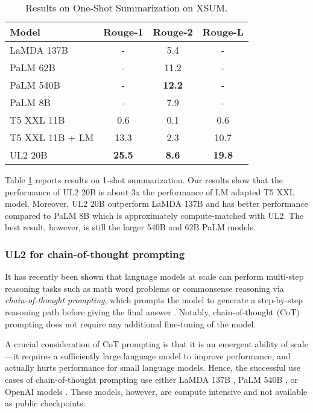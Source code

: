 \documentclass[10pt]{article}
\begin{document}
\begin{table}[H]
    \centering
    \small
      \caption{Results on One-Shot Summarization on XSUM.}
    \label{tab:1shot_xsum}
    \begin{tabular}{lccc}
    \toprule 
    Model     & Rouge-1 & Rouge-2 & Rouge-L  \\
    \midrule
    LaMDA 137B & - & 5.4 & -\\
    PaLM 62B & - & 11.2 & -\\
    PaLM 540B & - & \textbf{12.2} & -\\
    \midrule
    PaLM 8B & - & 7.9 & - \\
        T5 XXL 11B &  0.6 & 0.1 & 0.6 \\
        T5 XXL 11B + LM & 13.3 & 2.3 & 10.7 \\
        UL2 20B & \textbf{25.5} & \textbf{8.6} & \textbf{19.8}\\
        \bottomrule
    \end{tabular}
\end{table}
Table \ref{tab:1shot_xsum} reports results on 1-shot summarization. Our results show that the performance of UL2 20B is about 3x the performance of LM adapted T5 XXL model. Moreover, UL2 20B outperform LaMDA 137B and has better performance compared to PaLM 8B which is approximately compute-matched with UL2. The best result, however, is still the larger 540B and 62B PaLM models. 



\subsubsection{UL2 for chain-of-thought prompting}
It has recently been shown that language models at scale can perform multi-step reasoning tasks such as math word problems or commonsense reasoning via \textit{chain-of-thought prompting}, which prompts the model to generate a step-by-step reasoning path before giving the final answer \citep{wei2022chain}.
Notably, chain-of-thought (CoT) prompting does not require any additional fine-tuning of the model.

A crucial consideration of CoT prompting is that it is an emergent ability of scale \citep{wei2022emergent}---it requires a sufficiently large language model to improve performance, and actually hurts performance for small language models. 
Hence, the successful use cases of chain-of-thought prompting use either LaMDA 137B \citep{thoppilan2022lamda}, PaLM 540B \citep{chowdhery2022palm}, or OpenAI models \citep{brown2020language,ouyang2022training}.
These models, however, are compute intensive and not available as public checkpoints.
\end{document}

